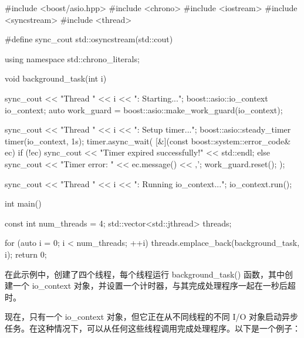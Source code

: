 \begin{cpp}
#include <boost/asio.hpp>
#include <chrono>
#include <iostream>
#include <syncstream>
#include <thread>

#define sync_cout std::osyncstream(std::cout)

using namespace std::chrono_literals;

void background_task(int i) {
    sync_cout << "Thread " << i << ": Starting...\n";
    boost::asio::io_context io_context;
    auto work_guard =
                boost::asio::make_work_guard(io_context);

    sync_cout << "Thread " << i << ": Setup timer...\n";
    boost::asio::steady_timer timer(io_context, 1s);
    timer.async_wait(
        [&](const boost::system::error_code& ec) {
        if (!ec) {
            sync_cout << "Timer expired successfully!"
                      << std::endl;
        } else {
            sync_cout << "Timer error: "
                      << ec.message() << ‚\n';
        }
        work_guard.reset();
    });

    sync_cout << "Thread " << i << ": Running
                    io_context...\n";
    io_context.run();
}

int main() {
    const int num_threads = 4;
    std::vector<std::jthread> threads;

    for (auto i = 0; i < num_threads; ++i) {
        threads.emplace_back(background_task, i);
    }
    return 0;
}
\end{cpp}

在此示例中，创建了四个线程，每个线程运行 background\_task() 函数，其中创建一个 io\_context 对象，并设置一个计时器，与其完成处理程序一起在一秒后超时。


现在，只有一个 io\_context 对象，但它正在从不同线程的不同 I/O 对象启动异步任务。在这种情况下，可以从任何这些线程调用完成处理程序。以下是一个例子：

